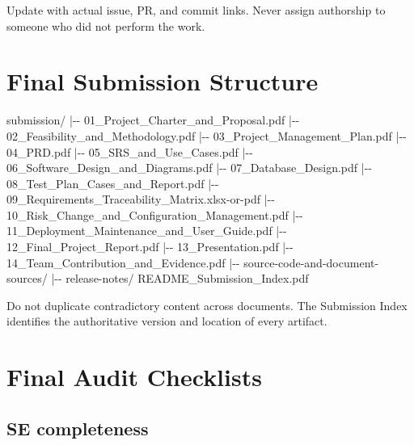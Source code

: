 \documentclass[
  10pt,
  a4paper,
  oneside]{report}
\newenvironment{Shaded}{}{}
\newcommand{\NormalTok}[1]{#1}
\begin{document}
Update with actual issue, PR, and commit links. Never assign authorship
to someone who did not perform the work.

\chapter{Final Submission
Structure}\label{26-final-submission-structure}

\begin{Shaded}
\begin{Highlighting}[]
\NormalTok{submission/}
\NormalTok{|{-}{-} 01\_Project\_Charter\_and\_Proposal.pdf}
\NormalTok{|{-}{-} 02\_Feasibility\_and\_Methodology.pdf}
\NormalTok{|{-}{-} 03\_Project\_Management\_Plan.pdf}
\NormalTok{|{-}{-} 04\_PRD.pdf}
\NormalTok{|{-}{-} 05\_SRS\_and\_Use\_Cases.pdf}
\NormalTok{|{-}{-} 06\_Software\_Design\_and\_Diagrams.pdf}
\NormalTok{|{-}{-} 07\_Database\_Design.pdf}
\NormalTok{|{-}{-} 08\_Test\_Plan\_Cases\_and\_Report.pdf}
\NormalTok{|{-}{-} 09\_Requirements\_Traceability\_Matrix.xlsx{-}or{-}pdf}
\NormalTok{|{-}{-} 10\_Risk\_Change\_and\_Configuration\_Management.pdf}
\NormalTok{|{-}{-} 11\_Deployment\_Maintenance\_and\_User\_Guide.pdf}
\NormalTok{|{-}{-} 12\_Final\_Project\_Report.pdf}
\NormalTok{|{-}{-} 13\_Presentation.pdf}
\NormalTok{|{-}{-} 14\_Team\_Contribution\_and\_Evidence.pdf}
\NormalTok{|{-}{-} source{-}code{-}and{-}document{-}sources/}
\NormalTok{|{-}{-} release{-}notes/}
\NormalTok{\textasciigrave{}{-}{-} README\_Submission\_Index.pdf}
\end{Highlighting}
\end{Shaded}

Do not duplicate contradictory content across documents. The Submission
Index identifies the authoritative version and location of every
artifact.

\chapter{Final Audit Checklists}\label{27-final-audit-checklists}

\section{SE completeness}\label{271-se-completeness}
\end{document}
